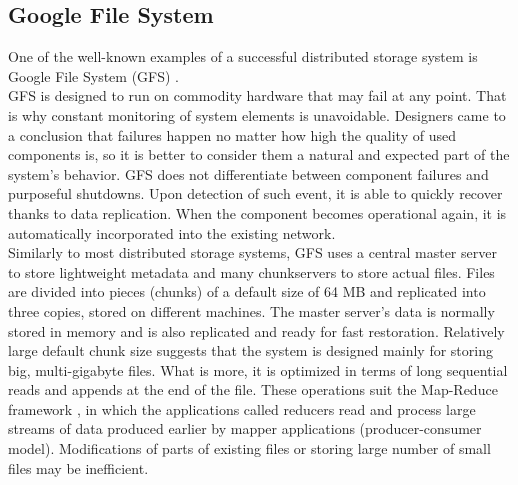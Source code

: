 \documentclass{pracamgren}
\begin{document}
\subsection{Google File System}

One of the well-known examples of a successful distributed storage system is Google File System (GFS) \cite{gfs}.\\

GFS is designed to run on commodity hardware that may fail at any point. That is why constant monitoring of system elements is unavoidable. Designers came to a conclusion that failures happen no matter how high the quality of used components is, so it is better to consider them a natural and expected part of the system's behavior. GFS does not differentiate between component failures and purposeful shutdowns. Upon detection of such event, it is able to quickly recover thanks to data replication. When the component becomes operational again, it is automatically incorporated into the existing network.\\

Similarly to most distributed storage systems, GFS uses a central master server to store lightweight metadata and many chunkservers to store actual files. Files are divided into pieces (chunks) of a default size of 64 MB and replicated into three copies, stored on different machines. The master server's data is normally stored in memory and is also replicated and ready for fast restoration. Relatively large default chunk size suggests that the system is designed mainly for storing big, multi-gigabyte files. What is more, it is optimized in terms of long sequential reads and appends at the end of the file. These operations suit the Map-Reduce framework \cite{mapreduce}, in which the applications called reducers read and process large streams of data produced earlier by mapper applications (producer-consumer model). Modifications of parts of existing files or storing large number of small files may be inefficient.\\
\end{document}
